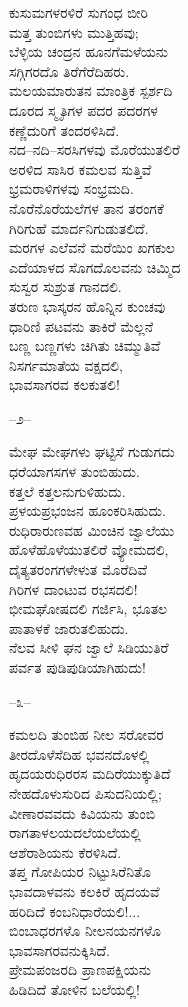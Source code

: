 ಕುಸುಮಗಳರಳಿರೆ ಸುಗಂಧ ಬೀರಿ\\ಮತ್ತ ತುಂಬಿಗಳು ಮುತ್ತಿಹವು;\\ಬೆಳ್ಳಿಯ ಚಂದ್ರನ ಹೂನಗೆಮಳೆಯನು\\ಸಗ್ಗಿಗರದೊ ತಿರೆಗೆರೆದಿಹರು.\\ಮಲಯಮಾರುತನ ಮಾಂತ್ರಿಕ ಸ್ಪರ್ಶದಿ\\ದೂರದ ಸ್ಮೃತಿಗಳ ಪದರ ಪದರಗಳ\\ಕಣ್ಣೆದುರಿಗೆ ತಂದರಳಿಸಿದೆ.\\ನದ–ನದಿ–ಸರಸಿಗಳವು ಮೊರೆಯುತಲಿರೆ\\ಅರಳಿದ ಸಾಸಿರ ಕಮಲವ ಸುತ್ತಿವೆ\\ಭ್ರಮರಾಳಿಗಳವು ಸಂಭ್ರಮದಿ.\\ನೊರೆನೊರೆಯಲೆಗಳ ತಾನ ತರಂಗಕೆ\\ಗಿರಿಗುಹೆ ಮಾರ್ದನಿಗುಡುತಲಿದೆ.\\ಮರಗಳ ಎಲೆವನೆ ಮರೆಯಿಂ ಖಗಕುಲ\\ಎದೆಯಾಳದ ಸೊಗದೊಲವನು ಚಿಮ್ಮಿದ\\ಸುಸ್ವರ ಸುಶ್ರುತ ಗಾನದಲಿ.\\ತರುಣ ಭಾಸ್ಕರನ ಹೊನ್ನಿನ ಕುಂಚವು\\ಧಾರಿಣಿ ಪಟವನು ತಾಕಿರೆ ಮೆಲ್ಲನೆ\\ಬಣ್ಣ ಬಣ್ಣಗಳು ಚಿಗಿತು ಚಿಮ್ಮುತಿವೆ\\ನಿಸರ್ಗಮಾತೆಯ ವಕ್ಷದಲಿ,\\ಭಾವಸಾಗರವ ಕಲಕುತಲಿ!

\begin{center}
–೨–
\end{center}

ಮೇಘ ಮೇಘಗಳು ಘಟ್ಟಿಸೆ ಗುಡುಗದು\\ಧರೆಯಾಗಸಗಳ ತುಂಬಿಹುದು.\\ಕತ್ತಲೆ ಕತ್ತಲನುಗುಳಿಹುದು.\\ಪ್ರಳಯಪ್ರಭಂಜನ ಹೂಂಕರಿಸಿಹುದು.\\ರುಧಿರಾರುಣವಹ ಮಿಂಚಿನ ಜ್ವಾಲೆಯು\\ಹೊಳೆಹೊಳೆಯುತಲಿರೆ ವ್ಯೋಮದಲಿ,\\ದೈತ್ಯತರಂಗಗಳೇಳುತ ಮೊರೆದಿವೆ\\ಗಿರಿಗಳ ದಾಂಟುವ ರಭಸದಲಿ!\\ಭೀಮಘೋಷದಲಿ ಗರ್ಜಿಸಿ, ಭೂತಲ\\ಪಾತಾಳಕೆ ಜಾರುತಲಿಹುದು.\\ನೆಲವ ಸೀಳಿ ಘನ ಜ್ವಾಲೆ ಸಿಡಿಯುತಿರೆ\\ಪರ್ವತ ಪುಡಿಪುಡಿಯಾಗಿಹುದು!

\begin{center}
–೩–
\end{center}

ಕಮಲದಿ ತುಂಬಿಹ ನೀಲ ಸರೋವರ\\ತೀರದೊಳೆಸೆದಿಹ ಭವನದೊಳಲ್ಲಿ\\ಹೃದಯರುಧಿರರಸ ಮದಿರೆಯುಕ್ಕುತಿದೆ\\ನೇಹದೊಳುಸುರಿದ ಪಿಸುದನಿಯಲ್ಲಿ;\\ವೀಣಾರವವದು ಕಿವಿಯನು ತುಂಬಿ\\ರಾಗತಾಳಲಯದಲೆಯಲೆಯಲ್ಲಿ\\ಆಶೆರಾಶಿಯನು ಕೆರಳಿಸಿದೆ.\\ತಪ್ತ ಗೋಪಿಯರ ನಿಟ್ಟುಸಿರೆನಿತೊ\\ಭಾವದಾಳವನು ಕಲಕಿರೆ ಹೃದಯವೆ\\ಹರಿದಿದೆ ಕಂಬನಿಧಾರೆಯಲಿ!...\\ಬಿಂಬಾಧರಗಳೊ ನೀಲನಯನಗಳೊ\\ಭಾವಸಾಗರವನುಕ್ಕಿಸಿದೆ.\\ಪ್ರೇಮಪಂಜರದಿ ಪ್ರಾಣಪಕ್ಷಿಯನು\\ಹಿಡಿದಿದೆ ತೋಳಿನ ಬಲೆಯಲ್ಲಿ!

